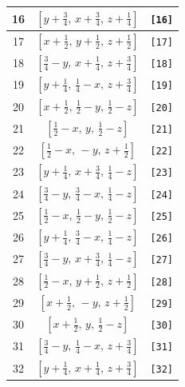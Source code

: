 \documentclass[fleqn,8pt]{jsarticle}
\begin{document}
\begin{longtable}{ccc}
16 & $\left[ y + \frac{3}{4},\, x + \frac{3}{4},\, z + \frac{1}{4} \right]$ & {\tt [16]} \\ \hline
17 & $\left[ x + \frac{1}{2},\, y + \frac{1}{2},\, z + \frac{1}{2} \right]$ & {\tt [17]} \\ \hline
18 & $\left[ \frac{3}{4} - y,\, x + \frac{1}{4},\, z + \frac{3}{4} \right]$ & {\tt [18]} \\ \hline
19 & $\left[ y + \frac{1}{4},\, \frac{1}{4} - x,\, z + \frac{3}{4} \right]$ & {\tt [19]} \\ \hline
20 & $\left[ x + \frac{1}{2},\, \frac{1}{2} - y,\, \frac{1}{2} - z \right]$ & {\tt [20]} \\ \hline
21 & $\left[ \frac{1}{2} - x,\, y,\, \frac{1}{2} - z \right]$ & {\tt [21]} \\ \hline
22 & $\left[ \frac{1}{2} - x,\, - y,\, z + \frac{1}{2} \right]$ & {\tt [22]} \\ \hline
23 & $\left[ y + \frac{1}{4},\, x + \frac{3}{4},\, \frac{1}{4} - z \right]$ & {\tt [23]} \\ \hline
24 & $\left[ \frac{3}{4} - y,\, \frac{3}{4} - x,\, \frac{1}{4} - z \right]$ & {\tt [24]} \\ \hline
25 & $\left[ \frac{1}{2} - x,\, \frac{1}{2} - y,\, \frac{1}{2} - z \right]$ & {\tt [25]} \\ \hline
26 & $\left[ y + \frac{1}{4},\, \frac{3}{4} - x,\, \frac{1}{4} - z \right]$ & {\tt [26]} \\ \hline
27 & $\left[ \frac{3}{4} - y,\, x + \frac{3}{4},\, \frac{1}{4} - z \right]$ & {\tt [27]} \\ \hline
28 & $\left[ \frac{1}{2} - x,\, y + \frac{1}{2},\, z + \frac{1}{2} \right]$ & {\tt [28]} \\ \hline
29 & $\left[ x + \frac{1}{2},\, - y,\, z + \frac{1}{2} \right]$ & {\tt [29]} \\ \hline
30 & $\left[ x + \frac{1}{2},\, y,\, \frac{1}{2} - z \right]$ & {\tt [30]} \\ \hline
31 & $\left[ \frac{3}{4} - y,\, \frac{1}{4} - x,\, z + \frac{3}{4} \right]$ & {\tt [31]} \\ \hline
32 & $\left[ y + \frac{1}{4},\, x + \frac{1}{4},\, z + \frac{3}{4} \right]$ & {\tt [32]} \\
\end{longtable}
\end{document}
